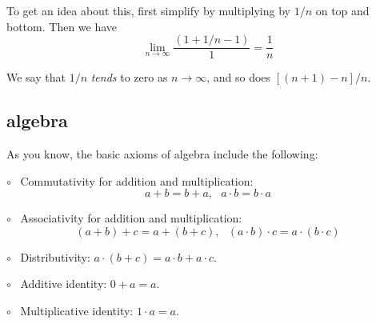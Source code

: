 \documentclass[11pt, oneside]{article}
\begin{document}
To get an idea about this, first simplify by multiplying by $1/n$ on top and bottom.  Then we have
\[ \lim_{n \rightarrow \infty} \frac{(1 + 1/n - 1)}{1} = \frac{1}{n} \]

We say that $1/n$ \emph{tends} to zero as $n \rightarrow \infty$, and so does $[(n+1)-n]/n$.

\subsection*{algebra}
As you know, the basic axioms of algebra include the following:

$\circ$ \ Commutativity for addition and multiplication: 
\[ a + b = b + a, \ \ \ a \cdot b = b \cdot a \]

$\circ$ \  Associativity for addition and multiplication:
\[ (a + b) + c = a + (b + c), \ \ \ (a \cdot b) \cdot c = a \cdot (b \cdot c) \]

$\circ$ \ Distributivity:  $a \cdot (b + c) = a \cdot b + a \cdot c$.

$\circ$ \ Additive identity:  $0 + a = a$.

$\circ$ \ Multiplicative identity:  $1 \cdot a = a$.
\end{document}

